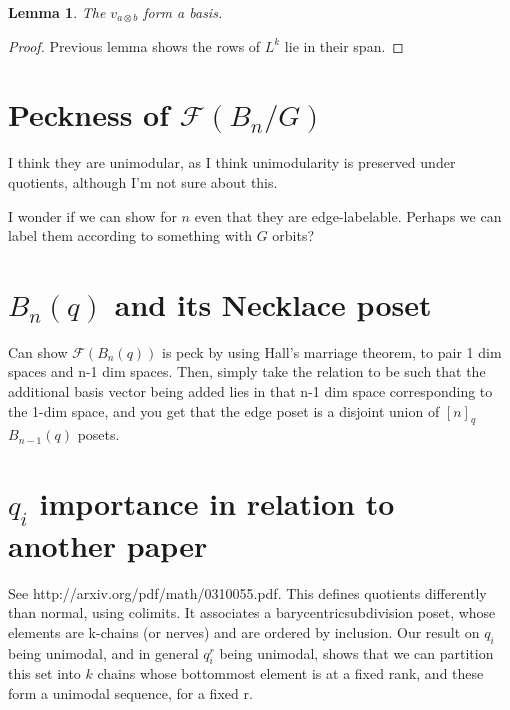 \documentclass{amsart}
\newtheorem{lem}[subsubsection]{Lemma}
\begin{document}
\begin{lem}
The $v_{a\otimes b}$ form a basis.
\end{lem}
\begin{proof}
Previous lemma shows the rows of $L^k$ lie in their span.
\end{proof}

\section{Peckness of $\mathcal F(B_n/G)$}

I think they are unimodular, as I think unimodularity is preserved under quotients, although I'm not sure about this.

I wonder if we can show for $n$ even that they are edge-labelable. Perhaps we can label them according to something with $G$ orbits?


\section{$B_n(q)$ and its Necklace poset}

Can show $\mathcal F(B_n(q))$ is peck by using Hall's marriage theorem, to pair 1 dim spaces and n-1 dim spaces. Then, simply take the relation to be such that the additional basis vector being added lies in that n-1 dim space corresponding to the 1-dim space, and you get that the edge poset is a disjoint union of $[n]_q$ $B_{n-1}(q)$ posets.

\section{$q_i$ importance in relation to another paper}

See http://arxiv.org/pdf/math/0310055.pdf. This defines quotients differently than normal, using colimits. It associates a barycentricsubdivision poset, whose elements are k-chains (or nerves) and are ordered by inclusion. Our result on $q_i$ being unimodal, and in general $q_i^r$ being unimodal, shows that we can partition this set into $k$ chains whose bottommost element is at a fixed rank, and these form a unimodal sequence, for a fixed r.
 
\end{document}

